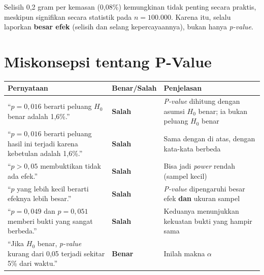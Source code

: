 \documentclass[
  indonesian,
  letterpaper,
]{book}
\newcounter{none} %
\begin{document}
Selisih 0,2 gram per kemasan (0,08\%) kemungkinan tidak penting secara
praktis, meskipun signifikan secara statistik pada \(n = 100.000\).
Karena itu, selalu laporkan \textbf{besar efek} (selisih dan selang
kepercayaannya), bukan hanya \emph{p-value}.

\section{Miskonsepsi tentang P-Value}\label{miskonsepsi-tentang-p-value}

{\def\LTcaptype{none} %
\begin{longtable}[]{@{}
  >{\raggedright\arraybackslash}p{}
  >{\raggedright\arraybackslash}p{}
  >{\raggedright\arraybackslash}p{}@{}}
\toprule\noalign{}
\begin{minipage}[b]{\linewidth}\raggedright
Pernyataan
\end{minipage} & \begin{minipage}[b]{\linewidth}\raggedright
Benar/Salah
\end{minipage} & \begin{minipage}[b]{\linewidth}\raggedright
Penjelasan
\end{minipage} \\
\midrule\noalign{}
\endhead
\bottomrule\noalign{}
\endlastfoot
``\(p = 0{,}016\) berarti peluang \(H_0\) benar adalah 1,6\%.'' &
\textbf{Salah} & \emph{P-value} dihitung dengan asumsi \(H_0\) benar; ia
bukan peluang \(H_0\) benar \\
``\(p = 0{,}016\) berarti peluang hasil ini terjadi karena kebetulan
adalah 1,6\%.'' & \textbf{Salah} & Sama dengan di atas, dengan kata-kata
berbeda \\
``\(p > 0{,}05\) membuktikan tidak ada efek.'' & \textbf{Salah} & Bisa
jadi \emph{power} rendah (sampel kecil) \\
``\(p\) yang lebih kecil berarti efeknya lebih besar.'' & \textbf{Salah}
& \emph{P-value} dipengaruhi besar efek \textbf{dan} ukuran sampel \\
``\(p = 0{,}049\) dan \(p = 0{,}051\) memberi bukti yang sangat
berbeda.'' & \textbf{Salah} & Keduanya menunjukkan kekuatan bukti yang
hampir sama \\
``Jika \(H_0\) benar, \emph{p-value} kurang dari 0,05 terjadi sekitar
5\% dari waktu.'' & \textbf{Benar} & Inilah makna \(\alpha\) \\
\end{longtable}
}
\end{document}
